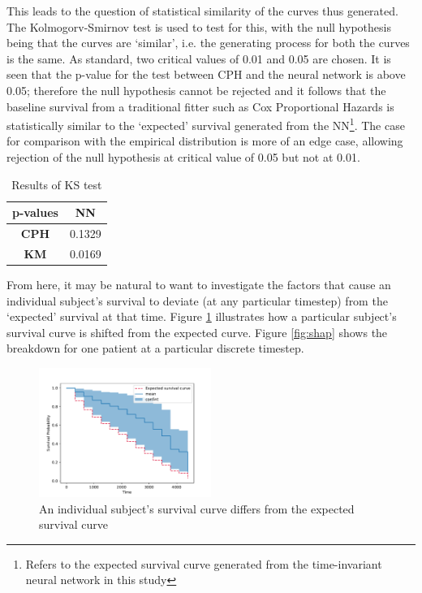 \documentclass[%
 twocolumn,
 reprint,
 amsmath,amssymb,
 aps,nofootinbib
]{revtex4-2}
\begin{document}
This leads to the question of statistical similarity of the curves thus generated. The Kolmogorv-Smirnov test \cite{ks_test_lilliefors} is used to test for this, with the null hypothesis being that the curves are `similar', i.e. the generating process for both the curves is the same. As standard, two critical values of 0.01 and 0.05 are chosen. It is seen that the p-value for the test between CPH and the neural network is above 0.05; therefore the null hypothesis cannot be rejected and it follows that the baseline survival from a traditional fitter such as Cox Proportional Hazards is statistically similar to the `expected' survival generated from the NN\footnote{Refers to the expected survival curve generated from the time-invariant neural network in this study}. The case for comparison with the empirical distribution is more of an edge case, allowing rejection of the null hypothesis at critical value of 0.05 but not at 0.01.\\

\begin{table}
  \centering
  \begin{tabular}{|c|c|}
  \hline
  \textbf{p-values}&\textbf{NN}\\
  \hline
  \textbf{CPH}&0.1329\\
  \hline
  \textbf{KM}&0.0169\\
  \hline
  \end{tabular}
  \caption[KS test]{Results of KS test}
  \label{tab:kstest}
\end{table}

From here, it may be natural to want to investigate the factors that cause an individual subject's survival to deviate (at any particular timestep) from the `expected' survival at that time. Figure \ref{fig:diff_exp_curve} illustrates how a particular subject's survival curve is shifted from the expected curve. Figure \ref{fig:shap} shows the breakdown for one patient at a particular discrete timestep. \\


\begin{figure}
  \centering
  \includegraphics[width=0.5\textwidth]{diff_exp_curve.pdf}
  \caption[Survival difference]{An individual subject's survival curve differs from the expected survival curve}
  \label{fig:diff_exp_curve}
\end{figure}
\end{document}
